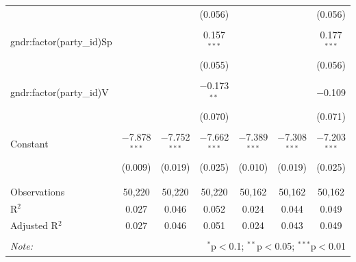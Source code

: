 \documentclass[12pt]{article}
\begin{document}
\begin{landscape}
\begin{longtable}{@{\extracolsep{5pt}}lcccccc}
			&  &  & (0.056) &  &  & (0.056) \\ 
			& & & & & & \\ 
			gndr:factor(party\_id)Sp &  &  & 0.157$^{***}$ &  &  & 0.177$^{***}$ \\ 
			&  &  & (0.055) &  &  & (0.056) \\ 
			& & & & & & \\ 
			gndr:factor(party\_id)V &  &  & $-$0.173$^{**}$ &  &  & $-$0.109 \\ 
			&  &  & (0.070) &  &  & (0.071) \\ 
			& & & & & & \\ 
			Constant & $-$7.878$^{***}$ & $-$7.752$^{***}$ & $-$7.662$^{***}$ & $-$7.389$^{***}$ & $-$7.308$^{***}$ & $-$7.203$^{***}$ \\ 
			& (0.009) & (0.019) & (0.025) & (0.010) & (0.019) & (0.025) \\ 
			& & & & & & \\ 
			\hline \\[-1.8ex] 
			Observations & 50,220 & 50,220 & 50,220 & 50,162 & 50,162 & 50,162 \\ 
			R$^{2}$ & 0.027 & 0.046 & 0.052 & 0.024 & 0.044 & 0.049 \\ 
			Adjusted R$^{2}$ & 0.027 & 0.046 & 0.051 & 0.024 & 0.043 & 0.049 \\ 
			\hline 
			\hline \\[-1.8ex] 
			\textit{Note:}  & \multicolumn{6}{r}{$^{*}$p$<$0.1; $^{**}$p$<$0.05; $^{***}$p$<$0.01} \\ 
		\end{longtable} 
	\end{landscape}
	
	
\end{document}
